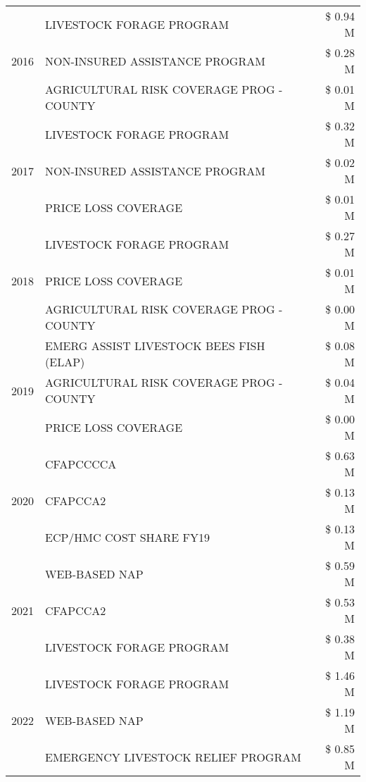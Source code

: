 \begin{tabular}{llr}
\cline{1-3}
\multirow[t]{3}{*}{2016} & LIVESTOCK FORAGE PROGRAM & \$ 0.94 M \\
 & NON-INSURED ASSISTANCE PROGRAM & \$ 0.28 M \\
 & AGRICULTURAL RISK COVERAGE PROG - COUNTY & \$ 0.01 M \\
\cline{1-3}
\multirow[t]{3}{*}{2017} & LIVESTOCK FORAGE PROGRAM & \$ 0.32 M \\
 & NON-INSURED ASSISTANCE PROGRAM & \$ 0.02 M \\
 & PRICE LOSS COVERAGE & \$ 0.01 M \\
\cline{1-3}
\multirow[t]{3}{*}{2018} & LIVESTOCK FORAGE PROGRAM & \$ 0.27 M \\
 & PRICE LOSS COVERAGE & \$ 0.01 M \\
 & AGRICULTURAL RISK COVERAGE PROG - COUNTY & \$ 0.00 M \\
\cline{1-3}
\multirow[t]{3}{*}{2019} & EMERG ASSIST LIVESTOCK BEES FISH (ELAP) & \$ 0.08 M \\
 & AGRICULTURAL RISK COVERAGE PROG - COUNTY & \$ 0.04 M \\
 & PRICE LOSS COVERAGE & \$ 0.00 M \\
\cline{1-3}
\multirow[t]{3}{*}{2020} & CFAPCCCCA & \$ 0.63 M \\
 & CFAPCCA2 & \$ 0.13 M \\
 & ECP/HMC COST SHARE FY19 & \$ 0.13 M \\
\cline{1-3}
\multirow[t]{3}{*}{2021} & WEB-BASED NAP & \$ 0.59 M \\
 & CFAPCCA2 & \$ 0.53 M \\
 & LIVESTOCK FORAGE PROGRAM & \$ 0.38 M \\
\cline{1-3}
\multirow[t]{3}{*}{2022} & LIVESTOCK FORAGE PROGRAM & \$ 1.46 M \\
 & WEB-BASED NAP & \$ 1.19 M \\
 & EMERGENCY LIVESTOCK RELIEF PROGRAM & \$ 0.85 M \\
\cline{1-3}
\bottomrule
\end{tabular}
